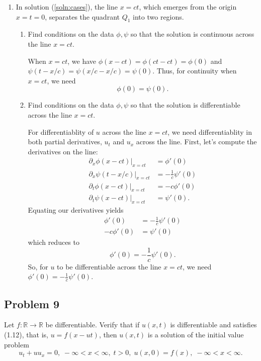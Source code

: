 \documentclass[a4paper,12pt]{article}
\newcommand{\reals}{\mathbb{R}}
\begin{document}
\begin{enumerate}[label = \textbf{(\alph*)}]
        \item In solution (\ref{soln:cases}), the line $ x = ct $, which emerges from the origin $ x = t = 0 $, separates the quadrant $ Q_1 $ into two regions.
        \begin{enumerate}[label = \textbf{(\roman*)}]
            \item Find conditions on the data $ \phi, \psi $ so that the solution is continuous across the line $ x = ct $.
            
            When $ x = ct $, we have $ \phi(x - ct) = \phi(ct - ct) = \phi(0) $ and $ \psi(t - x/c) = \psi(x/c - x/c) = \psi(0)$. Thus, for continuity when $ x = ct $, we need
            \[
                \phi(0) = \psi(0).
            \]
            
            \item Find conditions on the data $ \phi, \psi $ so that the solution is differentiable across the line $ x = ct $.
            
            For differentiablity of $ u $ across the line $ x = ct $, we need differentiablity in both partial derivatives, $ u_t $ and $ u_x $ across the line. First, let's compute the derivatives on the line:
            \begin{align*}
                \left.\partial_x \phi(x - ct)\right\lvert_{x = ct}  &= \phi'(0) \\
                \left.\partial_x \psi(t - x/c)\right\lvert_{x = ct} &= -\frac{1}{c}\psi'(0) \\
                \left.\partial_t  \phi(x - ct)\right\lvert_{x = ct}  &= -c\phi'(0) \\
                \left.\partial_t  \psi(x - ct)\right\lvert_{x = ct}  &= \psi'(0).
            \end{align*}
            Equating our derivatives yields
            \begin{align*}
                \phi'(0) &= -\frac{1}{c}\psi'(0) \\
                -c\phi'(0) &= \psi'(0)
            \end{align*}
            which reduces to
            \[
                \phi'(0) = -\frac{1}{c}\psi'(0).
            \]
            So, for $ u $ to be differentiable across the line $ x = ct $, we need $ \phi'(0) = -\frac{1}{c}\psi'(0) $.
        \end{enumerate}
    \end{enumerate}

\subsection*{Problem 9}
    Let $ f : \reals \to \reals $ be differentiable. Verify that if $ u(x, t) $ is differentiable and satisfies (1.12), that is, $ u = f(x - ut) $, then $ u(x, t) $ is a solution of the initial value problem
    \[
    	u_t + u u_x = 0, \; -\infty < x < \infty, \; t > 0, \;u(x, 0) = f(x), \; -\infty < x < \infty.
    \]
    
\end{document}
